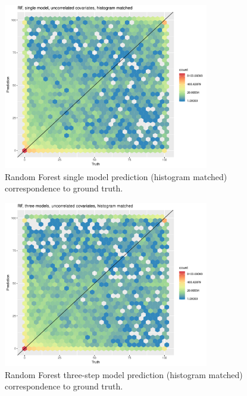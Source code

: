 \documentclass[a4paper,10pt]{article}
\begin{document}
\begin{figure}
    \includegraphics[width=0.8\textwidth]{article-figures/hexplots/2019-03-22-rf-1m-uncor-hm-hex}
    \caption{Random Forest single model prediction (histogram matched) correspondence to ground truth.}
    \label{hex-rf-1m-uncor-hm}
\end{figure}
\begin{figure}
    \includegraphics[width=0.8\textwidth]{article-figures/hexplots/2019-03-22-rf-3m-uncor-hm-hex}
    \caption{Random Forest three-step model prediction (histogram matched) correspondence to ground truth.}
    \label{hex-rf-3m-uncor-hm}
\end{figure}
\end{document}
